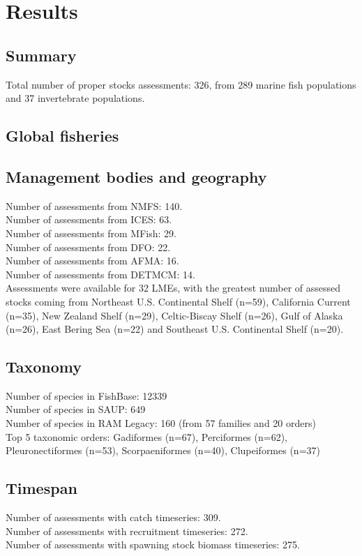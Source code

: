 \section*{Results}
\subsection*{Summary}
\noindent
Total number of proper stocks assessments: 326, from 289 marine fish populations and 37
invertebrate populations.


\subsection*{Global fisheries}

\subsection*{Management bodies and geography}
\noindent
Number of assessments from NMFS: 140.\\
Number of assessments from ICES: 63.\\
Number of assessments from MFish: 29.\\
Number of assessments from DFO: 22.\\
Number of assessments from AFMA: 16.\\
Number of assessments from DETMCM: 14.\\


Assessments were available for 32 LMEs, with the greatest number of
assessed stocks coming from Northeast U.S. Continental Shelf (n=59),
California Current (n=35), New Zealand Shelf (n=29),
Celtic-Biscay Shelf (n=26), Gulf of Alaska (n=26), East Bering Sea (n=22)
and Southeast U.S. Continental Shelf (n=20).

\subsection*{Taxonomy}
\noindent

Number of species in FishBase: 12339\\
Number of species in SAUP: 649\\
Number of species in RAM Legacy: 160 (from 57 families and 20 orders) \\
Top 5 taxonomic orders: Gadiformes (n=67), Perciformes (n=62), Pleuronectiformes (n=53), Scorpaeniformes (n=40), Clupeiformes (n=37) \\

\subsection*{Timespan}
\noindent
Number of assessments with catch timeseries: 309.\\
Number of assessments with recruitment timeseries: 272.\\
Number of assessments with spawning stock biomass timeseries: 275.\\

